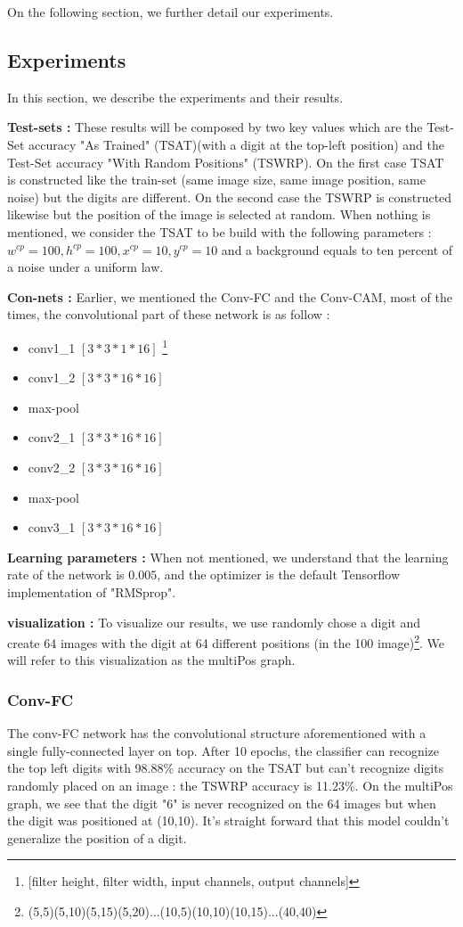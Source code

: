 			On the following section, we further detail our experiments.

		\subsection{Experiments}
		\label{sub:experiments}
			In this section, we describe the experiments and their results. 

			\textbf{Test-sets :} These results will be composed by two key values which are the Test-Set accuracy "As Trained" (TSAT)(with a digit at the top-left position) and the Test-Set accuracy "With Random Positions" (TSWRP). On the first case TSAT is constructed like the train-set (same image size, same image position, same noise) but the digits are different. On the second case the TSWRP is constructed likewise but the position of the image is selected at random. 
			When nothing is mentioned, we consider the TSAT to be build with the following parameters : $w^{cp}=100,h^{cp}=100, x^{cp}=10,y^{cp}=10$ and a background equals to ten percent of a noise under a uniform law.

			\textbf{Con-nets :}
			Earlier, we mentioned the Conv-FC and the Conv-CAM, most of the times, the convolutional part of these network is as follow :
			\begin{itemize}
				\item conv1\_1 $[3*3*1*16]$ \footnote{[filter height, filter width, input channels, output channels]}
				\item conv1\_2 $[3*3*16*16]$
				\item max-pool
				\item conv2\_1 $[3*3*16*16]$
				\item conv2\_2 $[3*3*16*16]$
				\item max-pool
				\item conv3\_1 $[3*3*16*16]$
			\end{itemize}
			\textbf{Learning parameters :} When not mentioned, we understand that the learning rate of the network is $0.005$, and the optimizer is the default Tensorflow implementation of "RMSprop".

			\textbf{visualization :} To visualize our results, we use randomly chose a digit and create 64 images with the digit at 64 different positions (in the 100 image)\footnote{(5,5)(5,10)(5,15)(5,20)...(10,5)(10,10)(10,15)...(40,40)}. We will refer to this visualization as the multiPos graph.

			\subsubsection{Conv-FC} 
			\label{ssub:conv_fc}
				The conv-FC network has the convolutional structure aforementioned with a single fully-connected layer on top.
				After 10 epochs, the classifier can recognize the top left digits with 98.88\% accuracy on the TSAT but can't recognize digits randomly placed on an image : the TSWRP accuracy is 11.23\%. On the multiPos graph, we see that the digit "6" is never recognized on the 64 images but when the digit was positioned at (10,10).
				It's straight forward that this model couldn't generalize the position of a digit.

